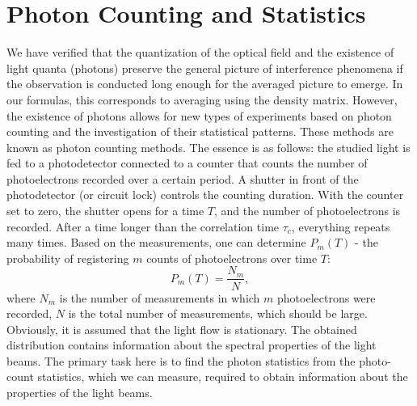 \section{Photon Counting and Statistics}

We have verified that the quantization of the optical field and the existence of light quanta (photons) preserve the general picture of interference phenomena if the observation is conducted long enough for the averaged picture to emerge. In our formulas, this corresponds to averaging using the density matrix. However, the existence of photons allows for new types of experiments based on photon counting and the investigation of their statistical patterns. These methods are known as photon counting methods. The essence is as follows: the studied light is fed to a photodetector connected to a counter that counts the number of photoelectrons recorded over a certain period. A shutter in front of the photodetector (or circuit lock) controls the counting duration. With the counter set to zero, the shutter opens for a time $T$, and the number of photoelectrons is recorded. After a time longer than the correlation time $\tau_c$, everything repeats many times. Based on the measurements, one can determine $P_m\left(T\right)$ - the probability of registering $m$ counts of photoelectrons over time $T$:
\begin{equation}
P_m\left(T\right) = \frac{N_m}{N},
\label{eqCh4_40}
\end{equation}
where $N_m$ is the number of measurements in which $m$ photoelectrons were recorded, $N$ is the total number of measurements, which should be large. Obviously, it is assumed that the light flow is stationary. The obtained distribution contains information about the spectral properties of the light beams. The primary task here is to find the photon statistics from the photo-count statistics, which we can measure, required to obtain information about the properties of the light beams.